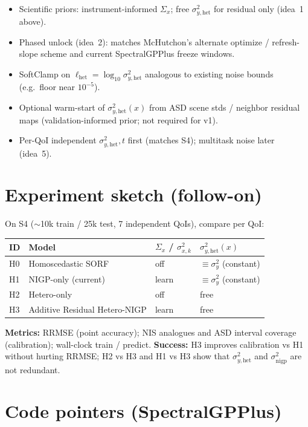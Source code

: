 \documentclass[11pt]{article}
\newcommand{\sigy}{\sigma_{y}^{2}}%
\newcommand{\sighet}{\sigma_{y,\mathrm{het}}^{2}}%
\newcommand{\signigp}{\sigma_{\mathrm{nigp}}^{2}}%
\newcommand{\Sigx}{\Sigma_{x}}%
\begin{document}
\begin{itemize}[leftmargin=1.2em,itemsep=0.25em]
  \item Scientific priors: instrument-informed $\Sigx$; free $\sighet$ for residual only
        (idea~1 above).
  \item Phased unlock (idea~2): matches McHutchon's alternate optimize / refresh-slope scheme
        \cite{mchutchon2011nigp} and current SpectralGPPlus freeze windows.
  \item SoftClamp on $\ell_{\mathrm{het}}=\log_{10}\sighet$ analogous to existing noise bounds
        (e.g.\ floor near $10^{-5}$).
  \item Optional warm-start of $\sighet(x)$ from ASD scene stds / neighbor residual maps
        (validation-informed prior; not required for v1).
  \item Per-QoI independent $\sighet,t$ first (matches S4); multitask noise later (idea~5).
\end{itemize}

\section{Experiment sketch (follow-on)}

On S4 ($\sim$10k train / 25k test, 7 independent QoIs), compare per QoI:

\begin{center}
\small
\begin{tabular}{@{}llll@{}}
\toprule
\textbf{ID} & \textbf{Model} & $\Sigx$ / $\sigma_{x,k}^{2}$ & $\sighet(x)$ \\
\midrule
H0 & Homoscedastic SORF & off & $\equiv\sigy$ (constant) \\
H1 & NIGP-only (current) & learn & $\equiv\sigy$ (constant) \\
H2 & Hetero-only & off & free \\
H3 & Additive Residual Hetero-NIGP & learn & free \\
\bottomrule
\end{tabular}
\end{center}

\vspace{0.75em}
\textbf{Metrics:} RRMSE (point accuracy); NIS analogues and ASD interval coverage
(calibration); wall-clock train / predict.
\textbf{Success:} H3 improves calibration vs H1 without hurting RRMSE; H2 vs H3 and
H1 vs H3 show that $\sighet$ and $\signigp$ are not redundant.

\section*{Code pointers (SpectralGPPlus)}
\end{document}

